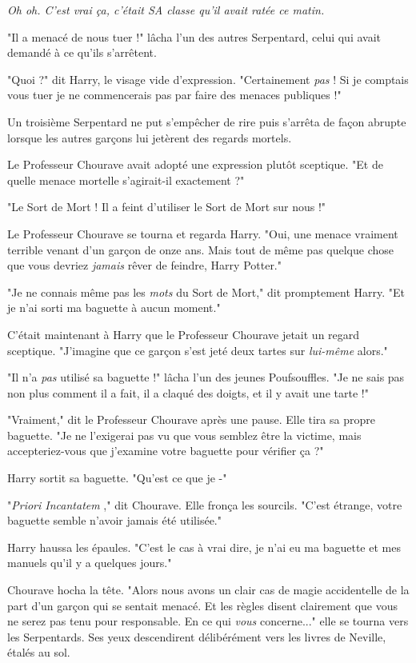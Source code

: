 \emph{Oh oh. C'est vrai ça, c'était SA classe qu'il avait ratée ce matin.} 

"Il a menacé de nous tuer !" lâcha l'un des autres Serpentard, celui qui avait demandé à ce qu'ils s'arrêtent.

"Quoi ?" dit Harry, le visage vide d'expression. "Certainement \emph{pas}  ! Si je comptais vous tuer je ne commencerais pas par faire des menaces publiques !"

Un troisième Serpentard ne put s'empêcher de rire puis s'arrêta de façon abrupte lorsque les autres garçons lui jetèrent des regards mortels.

Le Professeur Chourave avait adopté une expression plutôt sceptique. "Et de quelle menace mortelle s'agirait-il exactement ?"

"Le Sort de Mort ! Il a feint d'utiliser le Sort de Mort sur nous !"

Le Professeur Chourave se tourna et regarda Harry. "Oui, une menace vraiment terrible venant d'un garçon de onze ans. Mais tout de même pas quelque chose que vous devriez \emph{jamais } rêver de feindre, Harry Potter."

"Je ne connais même pas les \emph{mots}  du Sort de Mort," dit promptement Harry. "Et je n'ai sorti ma baguette à aucun moment."

C'était maintenant à Harry que le Professeur Chourave jetait un regard sceptique. "J'imagine que ce garçon s'est jeté deux tartes sur \emph{lui-même}  alors."

"Il n'a \emph{pas}  utilisé sa baguette !" lâcha l'un des jeunes Poufsouffles. "Je ne sais pas non plus comment il a fait, il a claqué des doigts, et il y avait une tarte !"

"Vraiment," dit le Professeur Chourave après une pause. Elle tira sa propre baguette. "Je ne l'exigerai pas vu que vous semblez être la victime, mais accepteriez-vous que j'examine votre baguette pour vérifier ça ?"

Harry sortit sa baguette. "Qu'est ce que je -"

"\emph{Priori Incantatem} ," dit Chourave. Elle fronça les sourcils. "C'est étrange, votre baguette semble n'avoir jamais été utilisée."

Harry haussa les épaules. "C'est le cas à vrai dire, je n'ai eu ma baguette et mes manuels qu'il y a quelques jours."

Chourave hocha la tête. "Alors nous avons un clair cas de magie accidentelle de la part d'un garçon qui se sentait menacé. Et les règles disent clairement que vous ne serez pas tenu pour responsable. En ce qui \emph{vous } concerne..." elle se tourna vers les Serpentards. Ses yeux descendirent délibérément vers les livres de Neville, étalés au sol.

